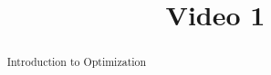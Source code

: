 \documentclass[handout]{ximera}
\title{Video 1}
\begin{document}
\begin{abstract}
Introduction to Optimization
\end{abstract}

\maketitle

\end{document}
